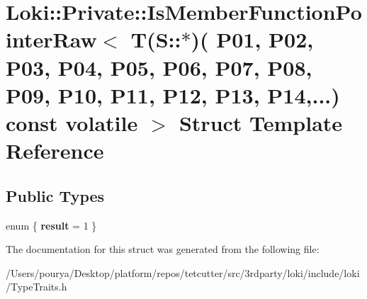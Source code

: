 \hypertarget{structLoki_1_1Private_1_1IsMemberFunctionPointerRaw_3_01T_07S_1_1_5_08_07_01_01_01_01_01_01_01_0800afb0972b417466fb906f9dd6b2231}{}\section{Loki\+:\+:Private\+:\+:Is\+Member\+Function\+Pointer\+Raw$<$ T(S\+:\+:$\ast$)( P01, P02, P03, P04, P05, P06, P07, P08, P09, P10, P11, P12, P13, P14,...) const volatile $>$ Struct Template Reference}
\label{structLoki_1_1Private_1_1IsMemberFunctionPointerRaw_3_01T_07S_1_1_5_08_07_01_01_01_01_01_01_01_0800afb0972b417466fb906f9dd6b2231}
\subsection*{Public Types}
\begin{DoxyCompactItemize}
\item 
\hypertarget{structLoki_1_1Private_1_1IsMemberFunctionPointerRaw_3_01T_07S_1_1_5_08_07_01_01_01_01_01_01_01_0800afb0972b417466fb906f9dd6b2231_acd0e283bac7bfaa440dfdb7e927ce49e}{}enum \{ {\bfseries result} = 1
 \}\label{structLoki_1_1Private_1_1IsMemberFunctionPointerRaw_3_01T_07S_1_1_5_08_07_01_01_01_01_01_01_01_0800afb0972b417466fb906f9dd6b2231_acd0e283bac7bfaa440dfdb7e927ce49e}

\end{DoxyCompactItemize}


The documentation for this struct was generated from the following file\+:\begin{DoxyCompactItemize}
\item 
/\+Users/pourya/\+Desktop/platform/repos/tetcutter/src/3rdparty/loki/include/loki/Type\+Traits.\+h\end{DoxyCompactItemize}
